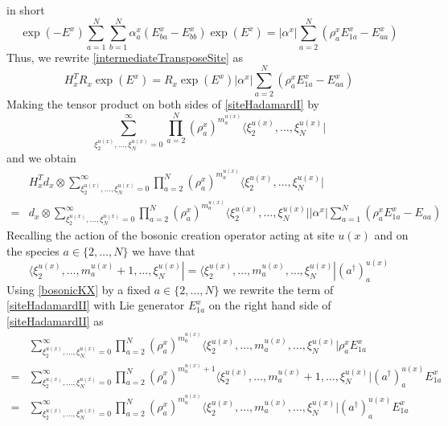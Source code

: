 \documentclass[11pt]{article}
\numberwithin{equation}{section}
\numberwithin{equation}{subsection}
\begin{document}
in short
\begin{equation}\label{HadTransfBoundary}
\exp{(-E^{x})}\sum_{a=1}^{N}\sum_{b=1}^{N}\alpha_{a}^{x}\left(E_{b a}^{x}-E_{bb}^{x}\right)\exp{(E^{x})}=	|\alpha^{x}|\sum_{a=2}^{N}\left(\rho_{a}^{x}E_{1a}^{x}-E_{aa}^{x}\right)
\end{equation}
Thus, we rewrite \eqref{intermediateTransposeSite} as
\begin{equation}\label{siteHadamardI}
H_{x}^{T}R_{x}\exp{(E^{x})}=R_{x}\exp{(E^{x})}|\alpha^{x}|\sum_{a=2}^{N}\left(\rho_{a}^{x}E_{1a}^{x}-E_{aa}^{x}\right)
\end{equation}
Making the tensor product on both sides of \eqref{siteHadamardI} by 
\begin{equation}
\sum_{\xi_{2}^{u(x)},\ldots,\xi_{N}^{u(x)}=0}^{\infty}\prod_{a=2}^{N}\left(\rho_{a}^{x}\right)^{m_{a}^{u(x)}}\langle \xi_{2}^{u(x)},\ldots,\xi_{N}^{u(x)}|
\end{equation}
and we obtain 
\begin{equation}\label{siteHadamardII}
    \begin{split}
&H_{x}^{T}d_{x}\otimes\sum_{\xi_{2}^{u(x)},\ldots,\xi_{N}^{u(x)}=0}^{\infty}\prod_{a=2}^{N}\left(\rho_{a}^{x}\right)^{m_{a}^{u(x)}}\langle \xi_{2}^{u(x)},\ldots,\xi_{N}^{u(x)}|
\\=&
d_{x}\otimes \sum_{\xi_{2}^{u(x)},\ldots,\xi_{N}^{u(x)}=0}^{\infty}\prod_{a=2}^{N}\left(\rho_{a}^{x}\right)^{m_{a}^{u(x)}}\langle \xi_{2}^{u(x)},\ldots,\xi_{N}^{u(x)}||\alpha^{x}|\sum_{a=1}^{N}\left(\rho_{a}^{x}E_{1a}^{x}-E_{aa}\right)
    \end{split}
\end{equation}
Recalling the action of the bosonic creation operator acting at site $u(x)$ and on the species $a\in \{2,\ldots,N\}$ we have that 
\begin{equation}\label{bosonicKX}
    \langle \xi_{2}^{u(x)},\ldots,m_{a}^{u(x)}+1,\ldots,\xi_{N}^{u(x)}|=  \langle \xi_{2}^{u(x)},\ldots,m_{a}^{u(x)},\ldots,\xi_{N}^{u(x)}|(a^{\dagger})^{u(x)}_{a}
\end{equation}
Using \eqref{bosonicKX} by a fixed $a\in \{2,\ldots,N\}$ we rewrite the term of \eqref{siteHadamardII} with Lie generator $E_{1a}^{x}$ on the right hand side of \eqref{siteHadamardII} as 
\begin{equation}
    \begin{split}
&\sum_{\xi_{2}^{u(x)},\ldots,\xi_{N}^{u(x)}=0}^{\infty}\prod_{a=2}^{N}\left(\rho_{a}^{x}\right)^{m_{a}^{u(x)}}\langle \xi_{2}^{u(x)},\ldots,m_{a}^{u(x)},\ldots,\xi_{N}^{u(x)}|\rho_{a}^{x}E_{1a}^{x}
\\=&\sum_{\xi_{2}^{u(x)},\ldots,\xi_{N}^{u(x)}=0}^{\infty}\prod_{a=2}^{N}\left(\rho_{a}^{x}\right)^{m_{a}^{u(x)}+1}\langle \xi_{2}^{u(x)},\ldots,m_{a}^{u(x)}+1,\ldots,\xi_{N}^{u(x)}|(a^{\dagger})_{a}^{u(x)}E_{1a}^{x}
\\=&
\sum_{\xi_{2}^{u(x)},\ldots,\xi_{N}^{u(x)}=0}^{\infty}\prod_{a=2}^{N}\left(\rho_{a}^{x}\right)^{m_{a}^{u(x)}}\langle \xi_{2}^{u(x)},\ldots,m_{a}^{u(x)},\ldots,\xi_{N}^{u(x)}|(a^{\dagger})_{a}^{u(x)}E_{1a}^{x}
    \end{split}
\end{equation}
\end{document}
